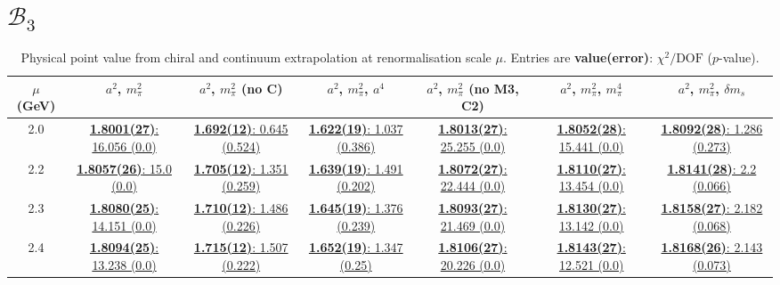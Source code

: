 \documentclass[12pt]{extarticle}
\begin{document}
\section{$\mathcal{B}_3$}
\begin{table}[h!]
\begin{center}
\begin{tabular}{|c|c|c|c|c|c|c|}
\hline
$\mu$ (GeV) & $a^2$, $m_\pi^2$& $a^2$, $m_\pi^2$ (no C)& $a^2$, $m_\pi^2$, $a^4$& $a^2$, $m_\pi^2$ (no M3, C2)& $a^2$, $m_\pi^2$, $m_\pi^4$& $a^2$, $m_\pi^2$, $\delta m_s$\\
\hline
2.0& \hyperlink{SSmPP/NPR/bag_a2m2_20.pdf.1}{\textbf{1.8001(27)}: 16.056 (0.0)} & \hyperlink{SSmPP/NPR/bag_a2m2noC_20.pdf.1}{\textbf{1.692(12)}: 0.645 (0.524)} & \hyperlink{SSmPP/NPR/bag_a2a4m2_20.pdf.1}{\textbf{1.622(19)}: 1.037 (0.386)} & \hyperlink{SSmPP/NPR/bag_a2m2mcut_20.pdf.1}{\textbf{1.8013(27)}: 25.255 (0.0)} & \hyperlink{SSmPP/NPR/bag_a2m2m4_20.pdf.1}{\textbf{1.8052(28)}: 15.441 (0.0)} & \hyperlink{SSmPP/NPR/bag_a2m2delm_20.pdf.1}{\textbf{1.8092(28)}: 1.286 (0.273)}\\
2.2& \hyperlink{SSmPP/NPR/bag_a2m2_22.pdf.1}{\textbf{1.8057(26)}: 15.0 (0.0)} & \hyperlink{SSmPP/NPR/bag_a2m2noC_22.pdf.1}{\textbf{1.705(12)}: 1.351 (0.259)} & \hyperlink{SSmPP/NPR/bag_a2a4m2_22.pdf.1}{\textbf{1.639(19)}: 1.491 (0.202)} & \hyperlink{SSmPP/NPR/bag_a2m2mcut_22.pdf.1}{\textbf{1.8072(27)}: 22.444 (0.0)} & \hyperlink{SSmPP/NPR/bag_a2m2m4_22.pdf.1}{\textbf{1.8110(27)}: 13.454 (0.0)} & \hyperlink{SSmPP/NPR/bag_a2m2delm_22.pdf.1}{\textbf{1.8141(28)}: 2.2 (0.066)}\\
2.3& \hyperlink{SSmPP/NPR/bag_a2m2_23.pdf.1}{\textbf{1.8080(25)}: 14.151 (0.0)} & \hyperlink{SSmPP/NPR/bag_a2m2noC_23.pdf.1}{\textbf{1.710(12)}: 1.486 (0.226)} & \hyperlink{SSmPP/NPR/bag_a2a4m2_23.pdf.1}{\textbf{1.645(19)}: 1.376 (0.239)} & \hyperlink{SSmPP/NPR/bag_a2m2mcut_23.pdf.1}{\textbf{1.8093(27)}: 21.469 (0.0)} & \hyperlink{SSmPP/NPR/bag_a2m2m4_23.pdf.1}{\textbf{1.8130(27)}: 13.142 (0.0)} & \hyperlink{SSmPP/NPR/bag_a2m2delm_23.pdf.1}{\textbf{1.8158(27)}: 2.182 (0.068)}\\
2.4& \hyperlink{SSmPP/NPR/bag_a2m2_24.pdf.1}{\textbf{1.8094(25)}: 13.238 (0.0)} & \hyperlink{SSmPP/NPR/bag_a2m2noC_24.pdf.1}{\textbf{1.715(12)}: 1.507 (0.222)} & \hyperlink{SSmPP/NPR/bag_a2a4m2_24.pdf.1}{\textbf{1.652(19)}: 1.347 (0.25)} & \hyperlink{SSmPP/NPR/bag_a2m2mcut_24.pdf.1}{\textbf{1.8106(27)}: 20.226 (0.0)} & \hyperlink{SSmPP/NPR/bag_a2m2m4_24.pdf.1}{\textbf{1.8143(27)}: 12.521 (0.0)} & \hyperlink{SSmPP/NPR/bag_a2m2delm_24.pdf.1}{\textbf{1.8168(26)}: 2.143 (0.073)}\\
\hline
\end{tabular}
\caption{Physical point value from chiral and continuum extrapolation at renormalisation scale $\mu$. Entries are \textbf{value(error)}: $\chi^2/\text{DOF}$ ($p$-value).}
\end{center}
\end{table}
\end{document}
